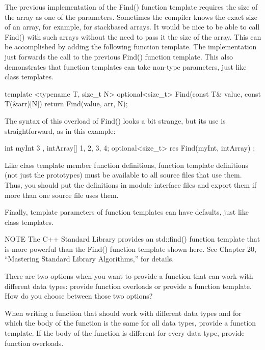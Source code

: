 The previous implementation of the Find() function template requires the size of the array as one of the parameters. Sometimes the compiler knows the exact size of an array, for example, for stackbased arrays. It would be nice to be able to call Find() with such arrays without the need to pass it the size of the array. This can be accomplished by adding the following function template. The implementation just forwards the call to the previous Find() function template. This also demonstrates that function templates can take non-type parameters, just like class templates.

\begin{cpp}
template <typename T, size_t N>
optional<size_t> Find(const T& value, const T(&arr)[N])
{
    return Find(value, arr, N);
}
\end{cpp}

The syntax of this overload of Find() looks a bit strange, but its use is straightforward, as in this example:

\begin{cpp}
int myInt { 3 }, intArray[] {1, 2, 3, 4};
optional<size_t> res { Find(myInt, intArray) };
\end{cpp}

Like class template member function definitions, function template definitions (not just the prototypes) must be available to all source files that use them. Thus, you should put the definitions in module interface files and export them if more than one source file uses them.

Finally, template parameters of function templates can have defaults, just like class templates.

\begin{myNotic}{NOTE}
The C++ Standard Library provides an std::find() function template that is more powerful than the Find() function template shown here. See Chapter 20, “Mastering Standard Library Algorithms,” for details.
\end{myNotic}


There are two options when you want to provide a function that can work with different data types: provide function overloads or provide a function template. How do you choose between those two options?

When writing a function that should work with different data types and for which the body of the function is the same for all data types, provide a function template. If the body of the function is different for every data type, provide function overloads.

